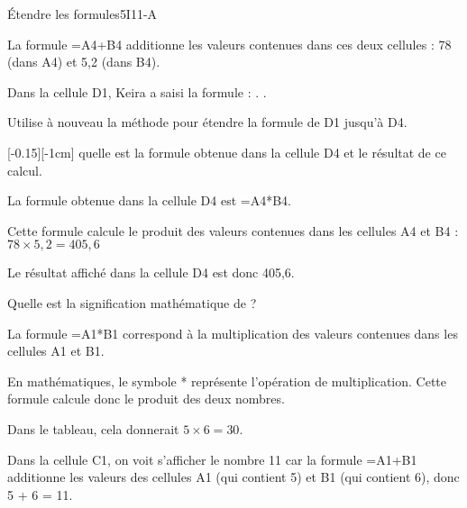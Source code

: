 \begin{EXO}{\'Etendre les formules}{5I11-A}
\begin{tcbenumerate}[1][7]
\begin{crep}
        La formule =A4+B4 additionne les valeurs contenues dans ces deux cellules : 78 (dans A4) et 5,2 (dans B4).
        \end{crep}
        
        \tcbitem {} Dans la cellule D1, Keira a saisi la formule : . .
        
        \tcbitem {}Utilise à nouveau la méthode pour étendre la formule de D1 jusqu'à D4. 
        
        [-0.15][-1cm] quelle est la formule obtenue dans la cellule D4 et le résultat de ce calcul.
        \begin{crep}%
        La formule obtenue dans la cellule D4 est =A4*B4.
        
        Cette formule calcule le produit des valeurs contenues dans les cellules A4 et B4 :
        $78 \times 5,2 = 405,6$
        
        Le résultat affiché dans la cellule D4 est donc 405,6.
        \end{crep}
    \end{tcbenumerate}

    \begin{tcbenumerate}[1][10]
        \tcbitem {} Quelle est la signification mathématique de  ?
        \begin{crep}%
        La formule =A1*B1 correspond à la multiplication des valeurs contenues dans les cellules A1 et B1.
        
        En mathématiques, le symbole * représente l'opération de multiplication. Cette formule calcule donc le produit des deux nombres.
        
        Dans le tableau, cela donnerait $5 \times 6 = 30$.
        \end{crep}
    \end{tcbenumerate}

\exocorrection

\begin{tcbenumerate}[1]
    \tcbitem Dans la cellule C1, on voit s'afficher le nombre 11 car la formule =A1+B1 additionne les valeurs des cellules A1 (qui contient 5) et B1 (qui contient 6), donc 5 + 6 = 11.
    

\end{tcbenumerate}
\end{EXO}
